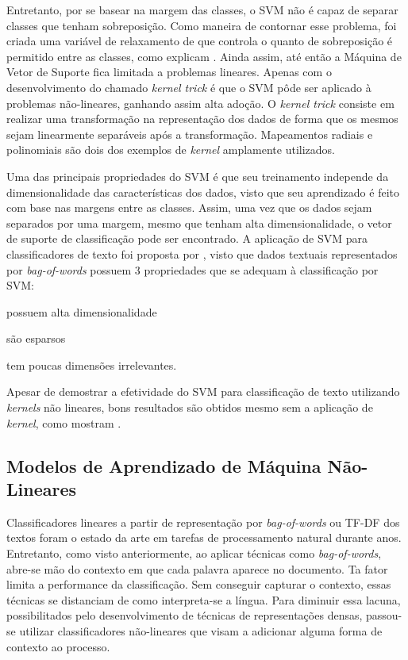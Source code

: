 Entretanto, por se basear na margem das classes, o SVM não é capaz de separar
classes que tenham sobreposição.
Como maneira de contornar esse problema, foi criada uma variável de relaxamento de
que controla o quanto de sobreposição é permitido entre as classes, como
explicam \citet{cortes95}.
Ainda assim, até então a Máquina de Vetor de Suporte fica limitada a problemas
lineares.
Apenas com o desenvolvimento do chamado \textit{kernel trick} é que o SVM pôde ser
aplicado à problemas não-lineares, ganhando assim alta adoção.
O \textit{kernel trick} consiste em realizar uma transformação na representação
dos dados de forma que os mesmos sejam linearmente separáveis após a
transformação.
Mapeamentos radiais e polinomiais são dois dos exemplos de \textit{kernel}
amplamente utilizados.

Uma das principais propriedades do SVM é que seu treinamento independe da
dimensionalidade das características dos dados, visto que seu aprendizado é feito
com base nas margens entre as classes.
Assim, uma vez que os dados sejam separados por uma margem, mesmo que tenham
alta dimensionalidade, o vetor de suporte de classificação pode ser encontrado.
A aplicação de SVM para classificadores de texto foi proposta por
\citet{joachims98}, visto que dados textuais representados por
\textit{bag-of-words} possuem 3 propriedades que se adequam à classificação por
SVM:
\begin {enumerate*} [label=\itshape\alph*\upshape)]
    \item possuem alta dimensionalidade
    \item são esparsos
    \item tem poucas dimensões irrelevantes.
\end {enumerate*}
Apesar de \citet{joachims98} demostrar a efetividade do SVM para classificação
de texto utilizando \textit{kernels} não lineares, bons resultados são obtidos
mesmo sem a aplicação de \textit{kernel}, como mostram \citet{pang02}.

\subsection{Modelos de Aprendizado de Máquina Não-Lineares}

Classificadores lineares a partir de representação por \textit{bag-of-words} ou
TF-DF dos textos foram o estado da arte em tarefas de processamento natural
durante anos.
Entretanto, como visto anteriormente, ao aplicar técnicas como
\textit{bag-of-words}, abre-se mão do contexto em que cada palavra aparece no
documento.
Ta fator limita a performance da classificação.
Sem conseguir capturar o contexto, essas técnicas se distanciam de como
interpreta-se a língua.
Para diminuir essa lacuna, possibilitados pelo desenvolvimento de técnicas de
representações densas, passou-se utilizar classificadores não-lineares que
visam a adicionar alguma forma de contexto ao processo.

